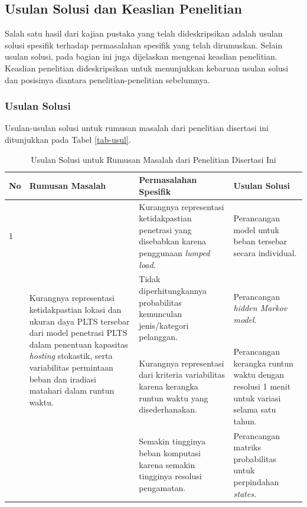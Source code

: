 {{{{{\subsection{Usulan Solusi dan Keaslian Penelitian}
Salah satu hasil dari kajian pustaka yang telah dideskripsikan adalah usulan solusi spesifik terhadap permasalahan spesifik yang telah dirumuskan. Selain usulan solusi, pada bagian ini juga dijelaskan mengenai keaslian penelitian. Keaslian penelitian dideskripsikan untuk menunjukkan kebaruan usulan solusi dan posisinya diantara penelitian-penelitian sebelumnya.

\subsubsection{Usulan Solusi}
Usulan-usulan solusi untuk rumusan masalah dari penelitian disertasi ini ditunjukkan pada Tabel \ref{tab-usul}.
\bgroup
\vspace{4pt}
{\renewcommand{\arraystretch}{1.3}
\begin{table}
	\caption{Usulan Solusi untuk Rumusan Masalah dari Penelitian Disertasi Ini}
	\vspace{-12pt}
	\begin{center}
		\begin{tabular}{|m{1.2em}|m{11.2em}|m{20em}|m{16em}|}
			\cline{1-4} 
			\textbf{No}&	
			\textbf{Rumusan Masalah}&
			\textbf{Permasalahan Spesifik}&
			\textbf{Usulan Solusi}\\
			\hline 1 & \multirow{4}{*}{\parbox{11.2em}{Kurangnya representasi ketidakpastian lokasi dan ukuran daya PLTS tersebar dari model penetrasi PLTS dalam penentuan kapasitas \textit{hosting} stokastik, serta variabilitas permintaan beban dan iradiasi matahari dalam runtun waktu.}} &Kurangnya representasi ketidakpastian penetrasi yang disebabkan karena penggunaan \textit{lumped load}. & Perancangan model untuk beban tersebar secara individual. \\
			\cline{3-4}& &Tidak diperhitungkannya probabilitas kemunculan jenis/kategori pelanggan. &Perancangan \textit{hidden Markov model}. \\
			\cline{3-4}& &Kurangnya representasi dari kriteria variabilitas karena kerangka runtun waktu yang disederhanakan. &Perancangan kerangka runtun waktu dengan resolusi 1 menit untuk variasi selama satu tahun. \\
			\cline{3-4}& &Semakin tingginya beban komputasi karena semakin tingginya resolusi pengamatan. & Perancangan matriks probabilitas untuk perpindahan \textit{states}. \\

\end{tabular}
\end{center}
\end{table}}}}}}}
